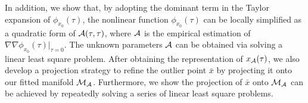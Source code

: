 \documentclass{article}
\theoremstyle{remark}
\begin{document}
In addition, we show that, by adopting the dominant term in the Taylor expansion of $\phi_{x_0}(\tau)$,  the nonlinear function $\phi_{x_0}(\tau)$ can be locally simplified as a quadratic form of ${\cal A}(\tau,\tau)$, where $\cal A$ is the empirical estimation of $\nabla\nabla \phi_{x_0}(\tau)|_{\tau=0}$. The unknown parameters $\cal A$ can be obtained via solving a linear least square problem. After obtaining the representation of $x_{\cal A}(\tau)$, we also develop a projection strategy to refine the outlier point $\bar{x}$ by projecting it onto our fitted manifold $\cal M_A$. Furthermore, we show the projection of $\bar{x}$ onto $\cal M_A$ can be achieved by repeatedly solving a series of linear least square problems.
%
\end{document}
